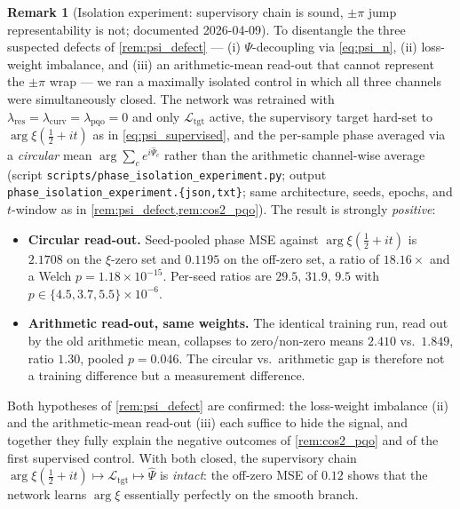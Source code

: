 \documentclass[11pt, a4paper]{article}
\theoremstyle{definition}
\newtheorem{remark}{Remark}[section]
\theoremstyle{plain}
\newcommand{\xif}{\xi}                      %
\newcommand{\Psip}{\Psi}                    %
\begin{document}
\begin{remark}[Isolation experiment: supervisory chain is sound, $\pm\pi$
jump representability is not; documented 2026-04-09]
\label{rem:isolation}
To disentangle the three suspected defects of \cref{rem:psi_defect} —
(i) $\Psip$-decoupling via \cref{eq:psi_n}, (ii) loss-weight
imbalance, and (iii) an arithmetic-mean read-out that cannot
represent the $\pm\pi$ wrap — we ran a maximally isolated control in
which all three channels were simultaneously closed. The network was
retrained with $\lambda_{\mathrm{res}}=\lambda_{\mathrm{curv}}
=\lambda_{\mathrm{pqo}}=0$ and only
$\mathcal{L}_{\mathrm{tgt}}$ active, the supervisory target hard-set
to $\arg\xif(\tfrac{1}{2}+it)$ as in \cref{eq:psi_supervised}, and
the per-sample phase averaged via a \emph{circular} mean
$\arg\sum_c e^{i\hat\Psip_c}$ rather than the arithmetic
channel-wise average (script
\texttt{scripts/phase\_isolation\_experiment.py}; output
\texttt{phase\_isolation\_experiment.\{json,txt\}}; same
architecture, seeds, epochs, and $t$-window as in
\cref{rem:psi_defect,rem:cos2_pqo}).
The result is strongly \emph{positive}:
\begin{itemize}
  \item \textbf{Circular read-out.} Seed-pooled phase MSE against
  $\arg\xif(\tfrac{1}{2}+it)$ is $2.1708$ on the $\xif$-zero set and
  $0.1195$ on the off-zero set, a ratio of $18.16\times$ and a Welch
  $p=1.18\times10^{-15}$. Per-seed ratios are $29.5,\,31.9,\,9.5$ with
  $p\in\{4.5,3.7,5.5\}\times10^{-6}$.
  \item \textbf{Arithmetic read-out, same weights.} The identical
  training run, read out by the old arithmetic mean, collapses to
  zero/non-zero means $2.410$ vs.\ $1.849$, ratio $1.30$, pooled
  $p=0.046$. The circular vs.\ arithmetic gap is therefore not a
  training difference but a measurement difference.
\end{itemize}
Both hypotheses of \cref{rem:psi_defect} are confirmed: the
loss-weight imbalance (ii) and the arithmetic-mean read-out (iii)
each suffice to hide the signal, and together they fully explain the
negative outcomes of \cref{rem:cos2_pqo} and of the first supervised
control. With both closed, the supervisory chain
$\arg\xif(\tfrac{1}{2}+it)\mapsto\mathcal{L}_{\mathrm{tgt}}\mapsto
\hat\Psip$ is \emph{intact}: the off-zero MSE of $0.12$ shows that
the network learns $\arg\xif$ essentially perfectly on the smooth
branch.


\end{remark}
\end{document}

